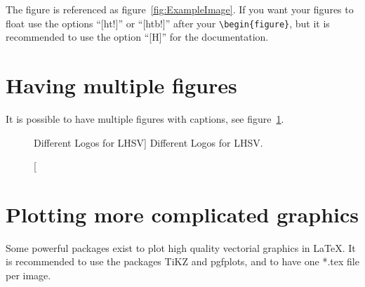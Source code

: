 The figure is referenced as figure~\ref{fig:ExampleImage}. If you want your
figures to float use the options ``[ht!]'' or ``[htb!]'' after your
\verb+\begin{figure}+, but it is recommended to use the option ``[H]'' for the
\telemacsystem{} documentation.

\section{Having multiple figures}

It is possible to have multiple figures with captions, see
figure~\ref{fig:ExampleMultipleImages}.

\begin{figure}[H]%
\begin{center}
%
\hfil
%
%
\hfil
%
%
\hfil
\mbox{}
\end{center}
\caption
[Different Logos for LHSV]
{Different Logos for LHSV.}
\label{fig:ExampleMultipleImages}
\end{figure}

\section{Plotting more complicated graphics}

Some powerful packages exist to plot high quality vectorial graphics in LaTeX.
It is recommended to use the packages TiKZ and pgfplots, and to have one *.tex
file per image.

